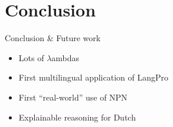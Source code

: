 \documentclass[aspectratio=169,handout]{beamer}
\begin{document}
\section{Conclusion}
\begin{frame}{Conclusion \& Future work}

\begin{itemize}
    \item[\emoji{check-mark}] Lots of $\lambda$ambdas
    \item[\emoji{check-mark}] First multilingual application of LangPro
    \item[\emoji{check-mark}] First ``real-world'' use of NPN
    \item[\emoji{check-mark}] Explainable reasoning for Dutch
\end{itemize}   

\vfill

\end{frame}

\appendix
\end{document}
